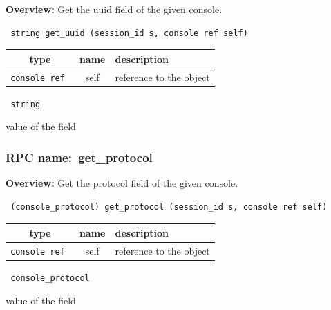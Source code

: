 {\bf Overview:} 
Get the uuid field of the given console.

\begin{verbatim} string get_uuid (session_id s, console ref self)\end{verbatim}



 
\vspace{0.3cm}
\begin{tabular}{|c|c|p{7cm}|}
 \hline
{\bf type} & {\bf name} & {\bf description} \\ \hline
{\tt console ref } & self & reference to the object \\ \hline 

\end{tabular}

\vspace{0.3cm}

{\tt 
string
}


value of the field
\vspace{0.3cm}
\vspace{0.3cm}
\vspace{0.3cm}
\subsubsection{RPC name:~get\_protocol}

{\bf Overview:} 
Get the protocol field of the given console.

\begin{verbatim} (console_protocol) get_protocol (session_id s, console ref self)\end{verbatim}



 
\vspace{0.3cm}
\begin{tabular}{|c|c|p{7cm}|}
 \hline
{\bf type} & {\bf name} & {\bf description} \\ \hline
{\tt console ref } & self & reference to the object \\ \hline 

\end{tabular}

\vspace{0.3cm}

{\tt 
console\_protocol
}


value of the field
\vspace{0.3cm}
\vspace{0.3cm}
\vspace{0.3cm}
